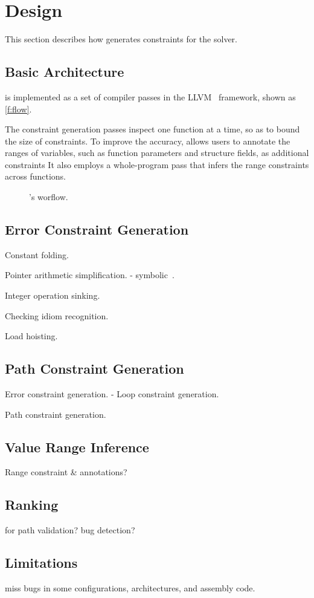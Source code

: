 \section{Design}
\label{s:gen}

This section describes how \sys generates constraints for the solver.

\subsection{Basic Architecture}

\sys is implemented as a set of compiler passes in the
LLVM~\cite{lattner:llvm} framework, shown as \autoref{f:flow}.

The constraint generation passes inspect one function at a time,
so as to bound the size of constraints.  To improve the accuracy,
\sys allows users to annotate the ranges of variables, such as
function parameters and structure fields, as additional constraints
It also employs a whole-program pass that infers the range constraints
across functions.

\begin{figure}
\centering
\resizebox{0.9\linewidth}{!}{

}
\caption{\sys's worflow.}
\label{f:flow}
\end{figure}

\subsection{Error Constraint Generation}


Constant folding.

Pointer arithmetic simplification.
- symbolic~\cite{engelen:symbolic}.

Integer operation sinking.

Checking idiom recognition.

Load hoisting.

\subsection{Path Constraint Generation}

Error constraint generation.
- Loop constraint generation.

Path constraint generation.

\subsection{Value Range Inference}

Range constraint \& annotations?

\subsection{Ranking}

for path validation? bug detection?

\subsection{Limitations}

miss bugs in some configurations, architectures,
and assembly code.
